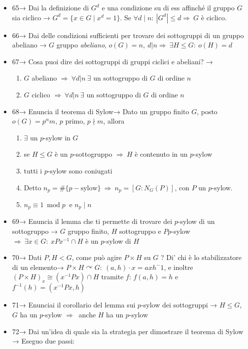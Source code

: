 \documentclass[A4,12pt]{article}
\newcommand{\acts}{\curvearrowright}
\newcommand{\then}{\Rightarrow}
\begin{document}
\begin{itemize}[noitemsep]
		\item 65→ Dai la definizione di $G^d$ e una condizione su di ess affinché il gruppo $G$ sia ciclico → $G^d = \{ x\in G\mid x^d = 1\}$. Se $\forall d \mid n:\ |G^d|\leq d \then\ G$ è ciclico. 
		\item 66→ Dai delle condizioni sufficienti per trovare dei sottogruppi di un gruppo abeliano → $ G $ gruppo \emph{abeliano}, $o(G) = n,\ d|n\then\ \exists H\leq G:\ o(H)=d$
		\item 67→ Cosa puoi dire dei sottogruppi di gruppi ciclici e abeliani? → \begin{enumerate}
			\item $ G $ abeliano $ \then\ \forall d|n\ \exists  $ un sottogruppo di $ G  $ di ordine $ n $ 
			\item $ G $ ciclico $ \then\ \forall d|n\ \exists  $ un sottogruppo di $ G  $ di ordine $ n $ 
		\end{enumerate}
		\item 68→ Enuncia il teorema di Sylow→ Dato un gruppo finito $ G $, posto $ o(G) = p^\alpha m$, $ p $ primo, $ p\nmid  m$, allora \begin{enumerate}
			\item $ \exists $ un $ p $-sylow in $ G $
			\item se $ H\leq G $ è un $ p $-sottogruppo $ \then\ H $ è contenuto in un $ p $-sylow
			\item tutti i $ p $-sylow sono coniugati
			\item Detto $ n_p=\#\{p-\text{sylow}\}\ \then\ n_p = [G:N_G(P)]$, con $ P $ un $ p $-sylow.
			\item $ n_p \equiv 1 \ \operatorname{mod} p\ $ e $ n_p\mid n $
		\end{enumerate}
		\item 69→ Enuncia il lemma che ti permette di trovare dei $ p $-sylow di un sottogruppo → $ G $ gruppo finito, $ H $ sottogruppo e $ P p$-sylow $ \then\ \exists x\in G:\ xPx^{-1}\cap H  $ è un $ p $-sylow di $ H $ 
		\item 70→ Dati $ P,H<G $, come può agire $ P\times H  $ su $ G $ ? Di' chi è lo stabilizzatore di un elemento→ $ P\times H \acts G:\ (a,h)\cdot x = axh^-1 $, e inoltre $ (P\times H)_x \cong (x^{-1}Px)\cap H$ tramite $ f $: $ f(a,h) = h $ e $ f^{-1}(h)=(x^{-1}Px,h) $
		\item 71→ Enunciai il corollario del lemma sui $ p $-sylow dei sottogruppi → $ H\leq G $, $ G $ ha un $ p $-sylow $ \then\  $ anche $ H $ ha un $ p $-sylow
		\item 72→ Dai un'idea di quale sia la strategia per dimostrare il teorema di Sylow → Eseguo due passi: \begin{enumerate}

\end{enumerate}
\end{itemize}
\end{document}
